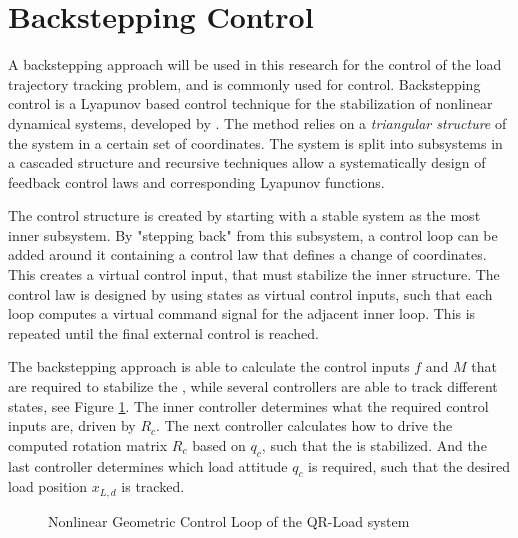 \newpage
\section{Backstepping Control}\label{sec:con.back}
A backstepping approach will be used in this research for the control of the load trajectory tracking problem, and is commonly used for  control\cite{Mahony2012}. Backstepping control is a Lyapunov based control technique for the stabilization of nonlinear dynamical systems, developed by \cite{Kanellakopoulos1991}. 
The method relies on a \textit{triangular structure} of the system in a certain set of coordinates. The system is split into subsystems in a cascaded structure and recursive techniques allow a systematically design of feedback control laws and corresponding Lyapunov functions.

The control structure is created by starting with a stable system as the most inner subsystem. 
By "stepping back" from this subsystem, a control loop can be added around it containing a control law that defines a change of coordinates. 
This creates a virtual control input, that must stabilize the inner structure.
The control law is designed by using states as virtual control inputs, such that each loop computes a virtual command signal for the adjacent inner loop. This is repeated until the final external control is reached.

The backstepping approach is able to calculate the control inputs $ f $ and $ M $ that are required to stabilize the , while several controllers are able to track different states, see Figure \ref{fig:con.loop}. 
The inner controller determines what the required control inputs are, driven by $ R_c $.  
The next controller calculates how to drive the computed rotation matrix $ R_c $ based on $ q_c $, such that the  is stabilized.
And the last controller determines which load attitude $ q_c $ is required, such that the desired load position $ x_{L,d} $ is tracked.
\begin{figure}[h!]
	\centering
	\caption{Nonlinear Geometric Control Loop of the QR-Load system \cite{Sreenath2013c}\label{fig:con.loop}}
\end{figure}	

